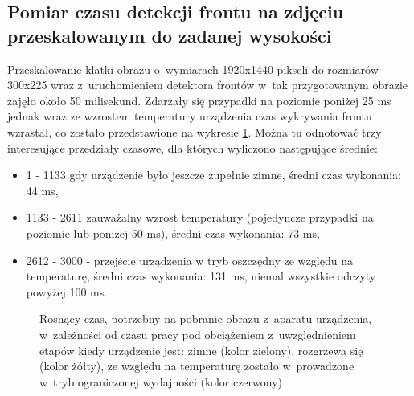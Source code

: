 \subsection{Pomiar czasu detekcji frontu na zdjęciu przeskalowanym do zadanej
	wysokości}

Przeskalowanie klatki obrazu o~wymiarach 1920x1440 pikseli do rozmiarów
300x225 wraz z~uruchomieniem detektora frontów w~tak przygotowanym obrazie
zajęło około 50 milisekund. Zdarzały się przypadki na poziomie poniżej
25 ms jednak wraz ze wzrostem temperatury urządzenia czas wykrywania 
frontu wzrastał, co zostało przedstawione na wykresie \ref{chart:detector_ms_time}.
Można tu odnotować trzy interesujące przedziały czasowe, dla których
wyliczono następujące średnie:
\begin{itemize}
	\item 1 - 1133 gdy urządzenie było jeszcze zupełnie zimne, średni czas
	wykonania: 44 ms,
	\item 1133 - 2611 zauważalny wzrost temperatury (pojedyncze przypadki na poziomie lub poniżej 50 ms), średni czas wykonania: 73 ms,
	\item 2612 - 3000 - przejście urządzenia w tryb oszczędny ze względu na temperaturę, średni czas wykonania: 131 ms,
	niemal wszystkie odczyty powyżej 100 ms.
\end{itemize}

\begin{figure}[h!]
	\begin{center}
	\end{center}
	\caption{Rosnący czas, potrzebny na pobranie obrazu z~aparatu urządzenia, w~zależności
		od czasu pracy pod obciążeniem z~uwzględnieniem etapów kiedy urządzenie jest:
		zimne (kolor zielony), rozgrzewa się (kolor żółty), ze względu na 
		temperaturę zostało w~prowadzone w~tryb
		ograniczonej wydajności (kolor czerwony)}
	\label{chart:detector_ms_time}
\end{figure}


